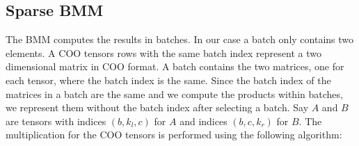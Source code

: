 \subsection{Sparse BMM}
The BMM computes the results in batches. In our case a batch only contains two elements. A COO tensors 
rows with the same batch index represent a two dimensional matrix in COO format. A batch contains 
the two matrices, one for each tensor, where the batch index is the same. Since the batch index of 
the matrices in a batch are the same and we compute the products within batches, we represent them 
without the batch index after selecting a batch. Say $A$ and $B$ are tensors with indices $(b, k_l, c)$ 
for $A$ and indices $(b, c, k_r)$ for $B$. The multiplication for the COO tensors is performed 
using the following algorithm:


